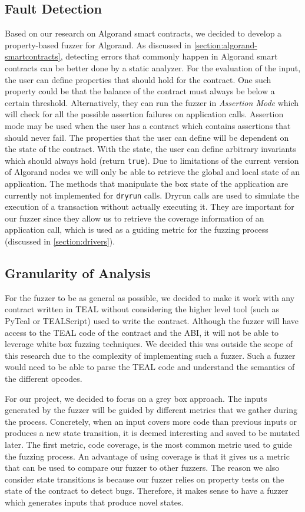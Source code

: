 \subsection*{Fault Detection}
Based on our research on Algorand smart contracts, we decided to develop a property-based fuzzer for Algorand.
As discussed in \ref{section:algorand-smartcontracts}, detecting errors that commonly happen in Algorand smart contracts can be better done by a static analyzer.
For the evaluation of the input, the user can define properties that should hold for the contract.
One such property could be that the balance of the contract must always be below a certain threshold.
Alternatively, they can run the fuzzer in \textit{Assertion Mode} which will check for all the possible assertion failures on application calls.
Assertion mode may be used when the user has a contract which contains assertions that should never fail.
The properties that the user can define will be dependent on the state of the contract.
With the state, the user can define arbitrary invariants which should always hold (return \texttt{true}).
Due to limitations of the current version of Algorand nodes we will only be able to retrieve the global and local state of an application.
The methods that manipulate the box state of the application are currently not implemented for \texttt{dryrun} calls.
Dryrun calls are used to simulate the execution of a transaction without actually executing it.
They are important for our fuzzer since they allow us to retrieve the coverage information of an application call, which is used as a guiding metric for the fuzzing process (discussed in \ref{section:drivers}).

\subsection*{Granularity of Analysis}
For the fuzzer to be as general as possible, we decided to make it work with any contract written in \ac{TEAL} without considering the higher level tool (such as PyTeal or TEALScript) used to write the contract.
Although the fuzzer will have access to the \ac{TEAL} code of the contract and the \ac{ABI}, it will not be able to leverage white box fuzzing techniques.
We decided this was outside the scope of this research due to the complexity of implementing such a fuzzer.
Such a fuzzer would need to be able to parse the \ac{TEAL} code and understand the semantics of the different opcodes.

For our project, we decided to focus on a grey box approach.
The inputs generated by the fuzzer will be guided by different metrics that we gather during the process.
Concretely, when an input covers more code than previous inputs or produces a new state transition, it is deemed interesting and saved to be mutated later.
The first metric, code coverage, is the most common metric used to guide the fuzzing process.
An advantage of using coverage is that it gives us a metric that can be used to compare our fuzzer to other fuzzers.
The reason we also consider state transitions is because our fuzzer relies on property tests on the state of the contract to detect bugs. Therefore, it makes sense to have a fuzzer which  generates inputs that produce novel states.

